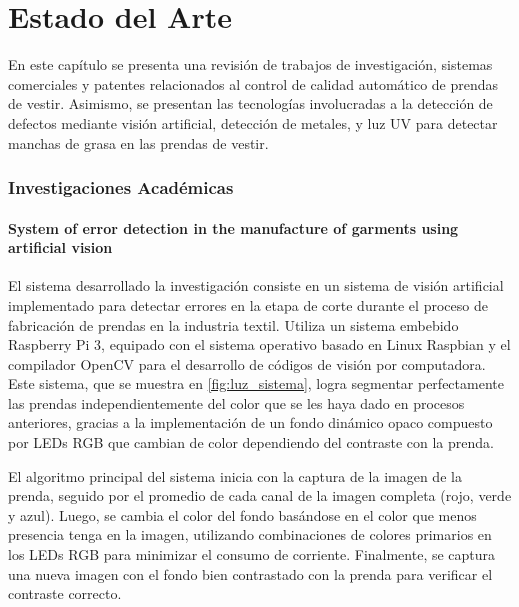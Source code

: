 \chapter{Estado del Arte}
\label{Estado del Arte}
En este capítulo se presenta una revisión de trabajos de investigación, sistemas comerciales y patentes relacionados al control de calidad automático de prendas de vestir. Asimismo, se presentan las tecnologías involucradas a la detección de defectos mediante visión artificial, detección de metales, y luz UV para detectar manchas de grasa en las prendas de vestir.


\subsection{Investigaciones Académicas}

\subsubsection{System of error detection in the manufacture of garments using artificial vision}

El sistema desarrollado la investigación \cite{Moreno2017} consiste en un sistema de visión artificial implementado para detectar errores en la etapa de corte durante el proceso de fabricación de prendas en la industria textil. Utiliza un sistema embebido Raspberry Pi 3, equipado con el sistema operativo basado en Linux Raspbian y el compilador OpenCV para el desarrollo de códigos de visión por computadora. Este sistema, que se muestra en \ref{fig:luz_sistema}, logra segmentar perfectamente las prendas independientemente del color que se les haya dado en procesos anteriores, gracias a la implementación de un fondo dinámico opaco compuesto por LEDs RGB que cambian de color dependiendo del contraste con la prenda.

El algoritmo principal del sistema inicia con la captura de la imagen de la prenda, seguido por el promedio de cada canal de la imagen completa (rojo, verde y azul). Luego, se cambia el color del fondo basándose en el color que menos presencia tenga en la imagen, utilizando combinaciones de colores primarios en los LEDs RGB para minimizar el consumo de corriente. Finalmente, se captura una nueva imagen con el fondo bien contrastado con la prenda para verificar el contraste correcto.

